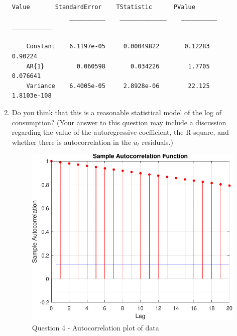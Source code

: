 \documentclass[11pt]{article}
\begin{document}
\begin{enumerate}
\begin{lstlisting}[caption={Matlab output from AR(1) model on residuals}, label=lst:resid-output]
                  Value       StandardError    TStatistic      PValue   
                __________    _____________    __________    ___________

    Constant    6.1197e-05     0.00049822       0.12283          0.90224
    AR{1}         0.060598       0.034226        1.7705         0.076641
    Variance    6.4005e-05     2.8928e-06        22.125      1.8103e-108
\end{lstlisting}

\newpage
\item  Do you think that this is a reasonable statistical model of the log of
consumption? (Your answer to this question may include a discussion regarding
the value of the autoregressive coefficient, the R-square, and whether there is
autocorrelation in the $u_t$ residuals.)

\begin{figure}[htp]
\centering
\includegraphics[scale=0.75]{data-autocorrelation-plot.pdf}
\caption{Question 4 - Autocorrelation plot of data}
\label{fig:q4-data-autocorrplot}
\end{figure}


\end{enumerate}
\end{document}
